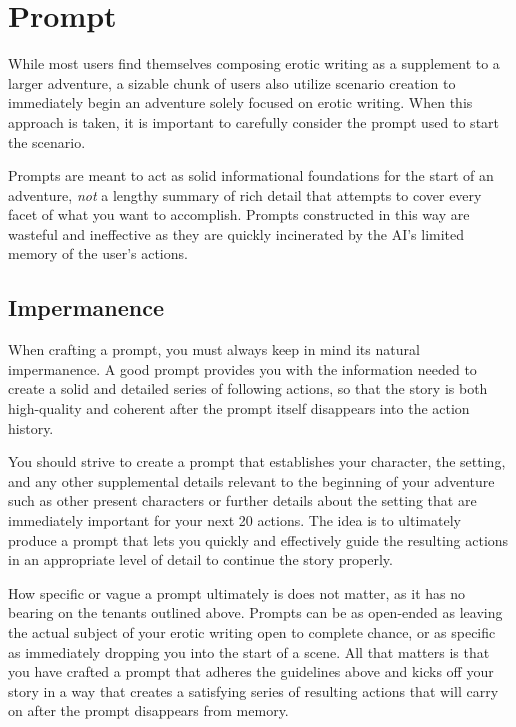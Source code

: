 \documentclass[Source-main.tex]{subfiles}
\begin{document}
\chapter{Prompt}
\label{ch:prompt}

While most users find themselves composing erotic writing as a supplement to a larger adventure, a sizable chunk of users also utilize scenario creation to immediately begin an adventure solely focused on erotic writing.
When this approach is taken, it is important to carefully consider the prompt used to start the scenario.

Prompts are meant to act as solid informational foundations for the start of an adventure, \emph{not} a lengthy summary of rich detail that attempts to cover every facet of what you want to accomplish.
Prompts constructed in this way are wasteful and ineffective as they are quickly incinerated by the AI’s limited memory of the user’s actions.

\section{Impermanence}
\label{sec:impermanence}

When crafting a prompt, you must always keep in mind its natural impermanence.
A good prompt provides you with the information needed to create a solid and detailed series of following actions, so that the story is both high-quality and coherent after the prompt itself disappears into the action history.

You should strive to create a prompt that establishes your character, the setting, and any other supplemental details relevant to the beginning of your adventure such as other present characters or further details about the setting that are immediately important for your next 20 actions.
The idea is to ultimately produce a prompt that lets you quickly and effectively guide the resulting actions in an appropriate level of detail to continue the story properly.

How specific or vague a prompt ultimately is does not matter, as it has no bearing on the tenants outlined above.
Prompts can be as open-ended as leaving the actual subject of your erotic writing open to complete chance, or as specific as immediately dropping you into the start of a scene.
All that matters is that you have crafted a prompt that adheres the guidelines above and kicks off your story in a way that creates a satisfying series of resulting actions that will carry on after the prompt disappears from memory.
\end{document}
